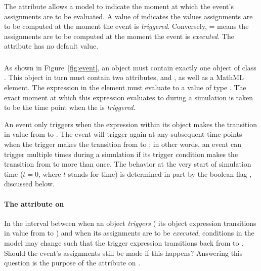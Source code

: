 The attribute  allows a model to
indicate the moment at which the event's assignments are to be
evaluated.  A value of  indicates the values assignments
are to be computed at the moment the event is \emph{triggered}.
Conversely, = means the
assignments are to be computed at the moment the event is
\emph{executed}.  The attribute has no default value.


\subsubsection{}
\label{sec:trigger}
\label{sec:event-trigger}

As shown in Figure~\ref{fig:event}, an \Event object must contain
exactly one object of class \Trigger.  This object in turn must
contain two attributes,  and
, as well as a MathML  element.
The expression in the  element must evaluate to a
value of type .  The exact moment at which this
expression evaluates to  during a simulation is taken to
be the time point when the \Event is \emph{triggered}.

An event only triggers when the expression within its \Trigger object
makes the transition in value from  to .  The
event will trigger again at any subsequent time points when the
trigger makes the transition from  to ; in
other words, an event can trigger multiple times during a simulation
if its trigger condition makes the transition from  to
 more than once.  The behavior at the very start of
simulation time (\ie $t = 0$, where $t$ stands for time) is
determined in part by the boolean flag
, discussed below.


\paragraph{The  attribute on }
\label{sec:trigger-persistent}

In the interval between when an \Event object \emph{triggers} (\ie
its \Trigger object expression transitions in value from
 to ) and when its assignments are to be
\emph{executed}, conditions in the model may change such that the
trigger expression transitions back from  to
.  Should the event's assignments still be made if this
happens?  Answering this question is the purpose of the
 attribute on \Trigger.

